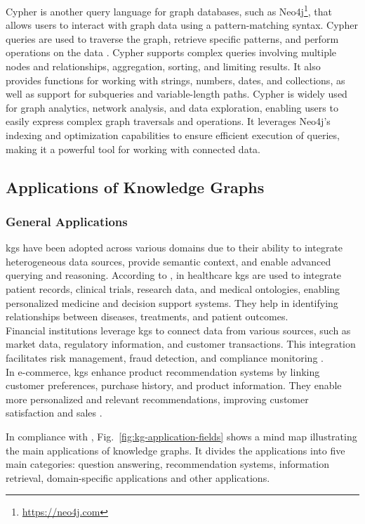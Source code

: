 Cypher is another query language for graph databases, such as Neo4j\footnote{\url{https://neo4j.com}}, that allows users to interact with graph data using a pattern-matching syntax. Cypher queries are used to traverse the graph, retrieve specific patterns, and perform operations on the data \cite{Francis2018}.
Cypher supports complex queries involving multiple nodes and relationships, aggregation, sorting, and limiting results. It also provides functions for working with strings, numbers, dates, and collections, as well as support for subqueries and variable-length paths.
Cypher is widely used for graph analytics, network analysis, and data exploration, enabling users to easily express complex graph traversals and operations. It leverages Neo4j's indexing and optimization capabilities to ensure efficient execution of queries, making it a powerful tool for working with connected data.

\subsection*{Applications of Knowledge Graphs}

\subsubsection*{General Applications}
\glspl{kg} have been adopted across various domains due to their ability to integrate heterogeneous data sources, provide semantic context, and enable advanced querying and reasoning.
According to \textcite{Kapanipathi2020}, in healthcare \glspl{kg} are used to integrate patient records, clinical trials, research data, and medical ontologies, enabling personalized medicine and decision support systems. They help in identifying relationships between diseases, treatments, and patient outcomes.
\\Financial institutions leverage \glspl{kg} to connect data from various sources, such as market data, regulatory information, and customer transactions. This integration facilitates risk management, fraud detection, and compliance monitoring \cite{Tchechmedjiev2019}.
\\In e-commerce, \glspl{kg} enhance product recommendation systems by linking customer preferences, purchase history, and product information. They enable more personalized and relevant recommendations, improving customer satisfaction and sales \cite{Zhang2021}.

In compliance with \textcite{Zou2020}, Fig.~\ref{fig:kg-application-fields} shows a mind map illustrating the main applications of knowledge graphs. It divides the applications into five main categories: question answering, recommendation systems, information retrieval, domain-specific applications and other applications.

